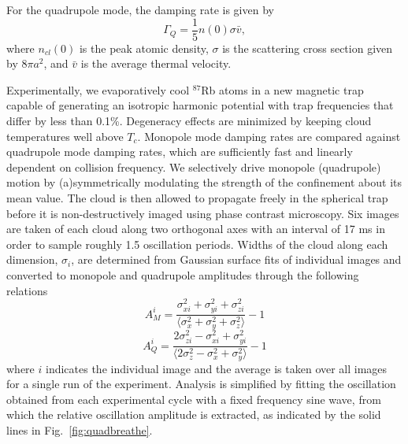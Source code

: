 \documentclass[%
 reprint,
 amsmath,amssymb,
 aps,
]{revtex4-1}
\begin{document}
For the quadrupole mode, the damping rate is given by
\begin{equation}
\Gamma_Q = \frac{1}{5} n\left(0\right)\sigma \bar{v},
\label{eq:quaddamprate}
\end{equation} 
where $n_{cl}\left(0\right)$ is the peak atomic density, $\sigma$ is the scattering cross section given by $8\pi a^2$, and $\bar{v}$ is the average thermal velocity. 



Experimentally, we evaporatively cool $^{87}$Rb atoms in a new magnetic trap capable of generating an isotropic harmonic potential with trap frequencies that differ by less than 0.1\%. Degeneracy effects are minimized by keeping cloud temperatures well above $T_c$. Monopole mode damping rates are compared against quadrupole mode damping rates, which are sufficiently fast and linearly dependent on collision frequency. We selectively drive monopole (quadrupole) motion by (a)symmetrically modulating the strength of the confinement about its mean value. The cloud is then allowed to propagate freely in the spherical trap before it is non-destructively imaged using phase contrast microscopy. Six images are taken of each cloud along two orthogonal axes with an interval of 17 ms in order to sample roughly 1.5 oscillation periods. Widths of the cloud along each dimension, $\sigma_i$, are determined from Gaussian surface fits of individual images and converted to monopole and quadrupole amplitudes through the following relations
\begin{equation}
A_M^i = \frac{\sigma_{xi}^2+\sigma_{yi}^2+\sigma_{zi}^2}{\langle \sigma_x^2+\sigma_y^2+\sigma_z^2\rangle}-1
\end{equation}
\begin{equation}
A_Q^i = \frac{2\sigma_{zi}^2-\sigma_{xi}^2+\sigma_{yi}^2}{\langle 2\sigma_z^2-\sigma_x^2+\sigma_y^2\rangle}-1
\end{equation}
where $i$ indicates the individual image and the average is taken over all images for a single run of the experiment.
Analysis is simplified by fitting the oscillation obtained from each experimental cycle with a fixed frequency sine wave, from which the relative oscillation amplitude is extracted, as indicated by the solid lines in Fig.~\ref{fig:quadbreathe}.
\end{document}
